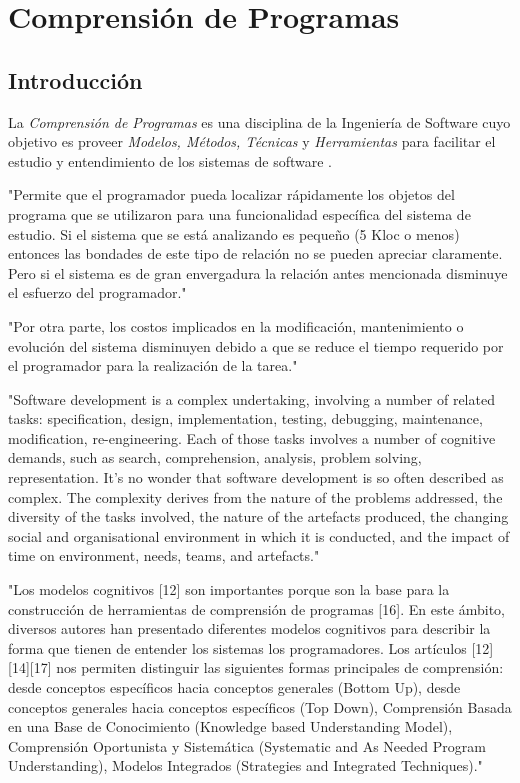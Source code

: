 \chapter{Comprensión de Programas}

\section{Introducción}

La \textit{Comprensión de Programas} es una disciplina de la Ingeniería de Software
cuyo objetivo es proveer \textit{Modelos, Métodos, Técnicas} y \textit{Herramientas}
para facilitar el estudio y entendimiento de los sistemas de software \cite{BeronHenriquesPereiraXX}.

"Permite que el programador pueda localizar rápidamente los objetos del programa que se
utilizaron para una funcionalidad específica del sistema de estudio.
Si el sistema que se está analizando es pequeño (5 Kloc o menos) entonces las bondades 
de este tipo de relación no se pueden apreciar claramente.
Pero si el sistema es de gran envergadura la relación antes mencionada disminuye el
esfuerzo del programador."\cite{BeronHenriquesPereiraXX}

"Por otra parte, los costos implicados en la modificación, mantenimiento o evolución
del sistema disminuyen debido a que se reduce el tiempo requerido por el programador
para la realización de la tarea."\cite{BeronHenriquesPereiraXX}

"Software development is a complex undertaking, involving a number of related tasks: specification,
design, implementation, testing, debugging, maintenance, modification, re-engineering. Each of those
tasks involves a number of cognitive demands, such as search, comprehension, analysis, problem
solving, representation. It’s no wonder that software development is so often described as complex.
The complexity derives from the nature of the problems addressed, the diversity of the tasks involved,
the nature of the artefacts produced, the changing social and organisational environment in which it is
conducted, and the impact of time on environment, needs, teams, and artefacts."\cite{PetreDeQuency06}

"Los modelos cognitivos [12] son importantes porque son la base para la construcción de herramientas
de comprensión de programas [16].
En este ámbito, diversos autores han presentado diferentes modelos cognitivos para describir
la forma que tienen de entender los sistemas los programadores.
Los artículos [12][14][17] nos permiten distinguir las siguientes formas principales de comprensión:
desde conceptos específicos hacia conceptos generales (Bottom Up), desde conceptos generales
hacia conceptos específicos (Top Down), Comprensión Basada en una Base de Conocimiento (Knowledge
based Understanding Model), Comprensión Oportunista y Sistemática (Systematic and As Needed Program
Understanding), Modelos Integrados (Strategies and Integrated Techniques)."
\cite{BeronHenriquesPereiraUzalXX}


